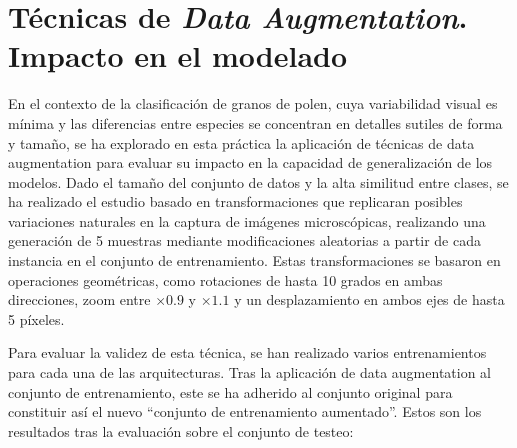 \documentclass[a4paper,12pt]{article}
\begin{document}
\newpage
\section{Técnicas de \textit{Data Augmentation}. Impacto en el modelado}


En el contexto de la clasificación de granos de polen, cuya variabilidad visual es mínima y las diferencias entre especies se concentran en detalles sutiles de forma y tamaño, se ha explorado en esta práctica la aplicación de técnicas de data augmentation para evaluar su impacto en la capacidad de generalización de los modelos. Dado el tamaño del conjunto de datos y la alta similitud entre clases, se ha realizado el estudio basado en transformaciones que replicaran posibles variaciones naturales en la captura de imágenes microscópicas, realizando una generación de 5 muestras mediante modificaciones aleatorias a partir de cada instancia en el conjunto de entrenamiento. Estas transformaciones se basaron en operaciones geométricas, como rotaciones de hasta 10 grados en ambas direcciones, zoom entre $\times 0.9$ y $\times 1.1$ y un desplazamiento en ambos ejes de hasta 5 píxeles.

Para evaluar la validez de esta técnica, se han realizado varios entrenamientos para cada una de las arquitecturas. Tras la aplicación de data augmentation al conjunto de entrenamiento, este se ha adherido al conjunto original para constituir así el nuevo ``conjunto de entrenamiento aumentado''. Estos son los resultados tras la evaluación sobre el conjunto de testeo:
\end{document}
